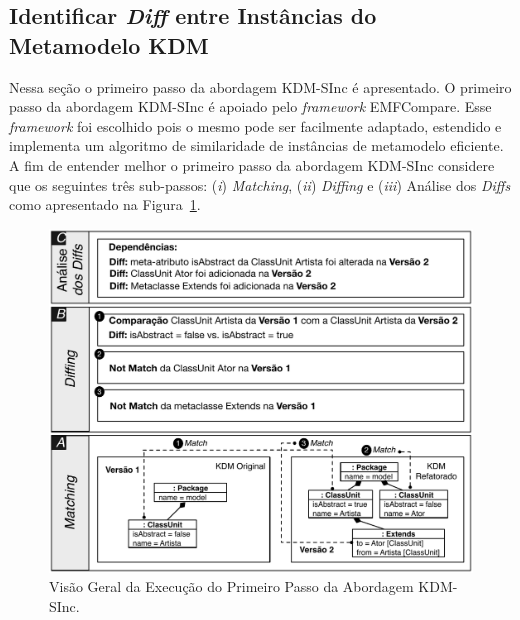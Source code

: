 
\subsection{Identificar \textit{Diff} entre Instâncias do Metamodelo KDM}\label{sec:diff_entre_kdm}

Nessa seção o primeiro passo da abordagem KDM-SInc é apresentado. O primeiro passo da abordagem KDM-SInc é apoiado pelo \textit{framework} EMFCompare. Esse \textit{framework} foi escolhido pois o mesmo pode ser facilmente adaptado, estendido e implementa um algoritmo de similaridade de instâncias de metamodelo eficiente. A fim de entender melhor o primeiro passo da abordagem KDM-SInc considere que os seguintes três sub-passos: (\textit{i}) \textit{Matching}, (\textit{ii}) \textit{Diffing} e (\textit{iii}) Análise dos \textit{Diffs} como apresentado na Figura~\ref{fig:diff_emf_compare}. 

\begin{figure}[h]
	\centering
	\caption{Visão Geral da Execução do Primeiro Passo da Abordagem KDM-SInc.}
	\label{fig:diff_emf_compare}
	\includegraphics[scale=0.7]{images/matching_diffing_analise_3}
	\fautor
\end{figure}

